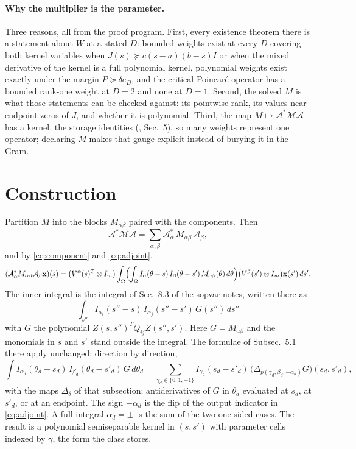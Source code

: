 \documentclass[12pt]{article}
\newcommand{\mcl}[1]{\mathcal{#1}}
\newcommand{\mbf}[1]{\mathbf{#1}}
\newcommand{\file}[1]{\path{#1}}      %
\theoremstyle{plain}
\theoremstyle{definition}
\theoremstyle{remark}
\begin{document}
\paragraph{Why the multiplier is the parameter.} Three reasons, all from the proof program. First, every existence theorem there is a statement about $W$ at a stated $D$: bounded weights exist at every $D$ covering both kernel variables when $J(s)\succeq c(s-a)(b-s)I$ or when the mixed derivative of the kernel is a full polynomial kernel, polynomial weights exist exactly under the margin $P\succeq\delta e_D$, and the critical Poincar\'e operator has a bounded rank-one weight at $D=2$ and none at $D=1$. Second, the solved $M$ is what those statements can be checked against: its pointwise rank, its values near endpoint zeros of $J$, and whether it is polynomial. Third, the map $M\mapsto\mcl A^*\mcl M\mcl A$ has a kernel, the storage identities (\file{canonical_measure_storage.md}, Sec.~5), so many weights represent one operator; declaring $M$ makes that gauge explicit instead of burying it in the Gram.

\section{Construction}\label{sec:construction}

Partition $M$ into the blocks $M_{\alpha\beta}$ paired with the components. Then
\begin{equation}\label{eq:AMA}
\mcl A^*\mcl M\mcl A=\sum_{\alpha,\beta}\mcl A_\alpha^*\,M_{\alpha\beta}\,\mcl A_\beta ,
\end{equation}
and by \eqref{eq:component} and \eqref{eq:adjoint},
\begin{equation}\label{eq:pair}
(\mcl A_\alpha^*M_{\alpha\beta}\mcl A_\beta\mbf x)(s)
=\bigl(V^\alpha(s)^T\otimes I_m\bigr)\int_\Omega\Bigl(\int_\Omega I_\alpha(\theta-s)\,I_\beta(\theta-s')\,M_{\alpha\beta}(\theta)\,d\theta\Bigr)\bigl(V^\beta(s')\otimes I_m\bigr)\mbf x(s')\,ds'.
\end{equation}
The inner integral is the integral of Sec.~8.3 of the sopvar notes, written there as
\[
\int_{s''}I_{\alpha_i}(s''-s)\,I_{\alpha_j}(s''-s')\,G(s'')\,ds''
\]
with $G$ the polynomial $Z(s,s'')^TQ_{ij}Z(s'',s')$. Here $G=M_{\alpha\beta}$ and the monomials in $s$ and $s'$ stand outside the integral. The formulae of Subsec.~5.1 there apply unchanged: direction by direction,
\[
\int I_{\alpha_d}(\theta_d-s_d)\,I_{\beta_d}(\theta_d-s'_d)\,G\,d\theta_d=\sum_{\gamma_d\in\{0,1,-1\}}I_{\gamma_d}(s_d-s'_d)\,\bigl(\Delta_{p(\gamma_d,\beta_d,-\alpha_d)}G\bigr)(s_d,s'_d),
\]
with the maps $\Delta_\delta$ of that subsection: antiderivatives of $G$ in $\theta_d$ evaluated at $s_d$, at $s'_d$, or at an endpoint. The sign $-\alpha_d$ is the flip of the output indicator in \eqref{eq:adjoint}. A full integral $\alpha_d=\pm$ is the sum of the two one-sided cases. The result is a polynomial semiseparable kernel in $(s,s')$ with parameter cells indexed by $\gamma$, the form the class stores.
\end{document}
